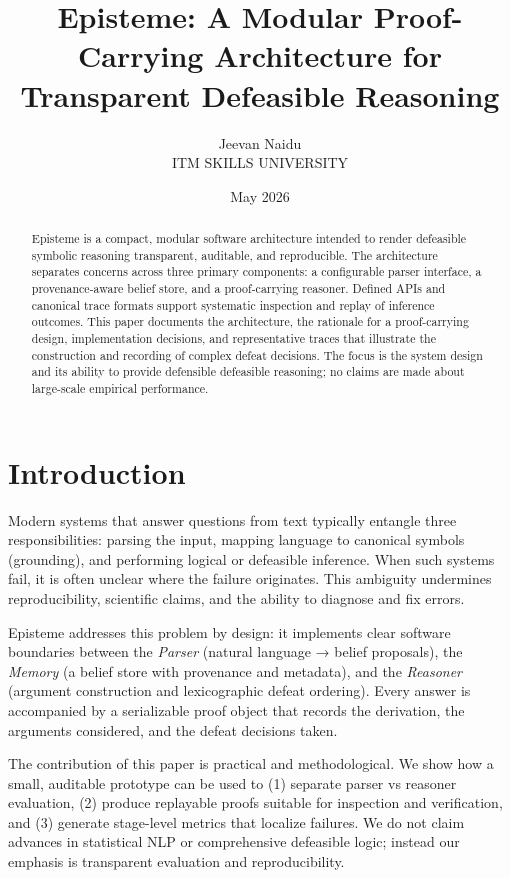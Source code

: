 \documentclass[11pt]{article}
\title{Episteme: A Modular Proof-Carrying Architecture for Transparent Defeasible Reasoning}
\author{Jeevan Naidu\\ITM SKILLS UNIVERSITY}
\date{May 2026}
\begin{document}
\maketitle

\begin{abstract}
Episteme is a compact, modular software architecture intended to render
defeasible symbolic reasoning transparent, auditable, and reproducible. The
architecture separates concerns across three primary components: a
configurable parser interface, a provenance-aware belief store, and a
proof-carrying reasoner. Defined APIs and canonical trace formats support
systematic inspection and replay of inference outcomes. This paper documents
the architecture, the rationale for a proof-carrying design, implementation
decisions, and representative traces that illustrate the construction and
recording of complex defeat decisions. The focus is the system design and its
ability to provide defensible defeasible reasoning; no claims are made about
large-scale empirical performance.
\end{abstract}

\section{Introduction}
Modern systems that answer questions from text typically entangle three responsibilities:
parsing the input, mapping language to canonical symbols (grounding), and performing
logical or defeasible inference. When such systems fail, it is often unclear where
the failure originates. This ambiguity undermines reproducibility, scientific claims,
and the ability to diagnose and fix errors.

Episteme addresses this problem by design: it implements clear software boundaries
between the \emph{Parser} (natural language → belief proposals), the \emph{Memory}
(a belief store with provenance and metadata), and the \emph{Reasoner} (argument
construction and lexicographic defeat ordering). Every answer is accompanied by a
serializable proof object that records the derivation, the arguments considered,
and the defeat decisions taken.

The contribution of this paper is practical and methodological. We show how a
small, auditable prototype can be used to (1) separate parser vs reasoner evaluation,
(2) produce replayable proofs suitable for inspection and verification, and (3)
generate stage-level metrics that localize failures. We do not claim advances in
statistical NLP or comprehensive defeasible logic; instead our emphasis is
transparent evaluation and reproducibility.
\end{document}
